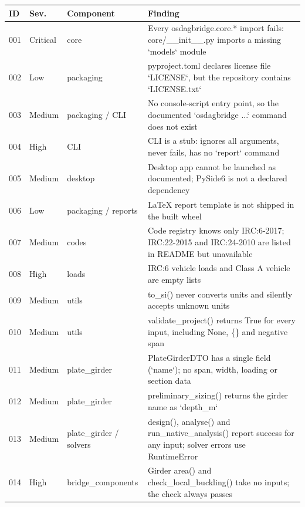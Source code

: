 \begin{longtable}{@{}p{0.9cm}p{1.5cm}p{2.6cm}p{8.2cm}@{}}
\toprule
\textbf{ID} & \textbf{Sev.} & \textbf{Component} & \textbf{Finding}\\
\midrule
\endhead
001 & Critical & core & Every osdagbridge.\allowbreak{}core.\allowbreak{}* import fails: core/\allowbreak{}\_\allowbreak{}\_\allowbreak{}init\_\allowbreak{}\_\allowbreak{}.\allowbreak{}py imports a missing `models` module \\
002 & Low & packaging & pyproject.\allowbreak{}toml declares license file `LICENSE`, but the repository contains `LICENSE.\allowbreak{}txt` \\
003 & Medium & packaging /\allowbreak{} CLI & No console-script entry point, so the documented `osdagbridge .\allowbreak{}.\allowbreak{}.\allowbreak{}` command does not exist \\
004 & High & CLI & CLI is a stub: ignores all arguments, never fails, has no `report` command \\
005 & Medium & desktop & Desktop app cannot be launched as documented; PySide6 is not a declared dependency \\
006 & Low & packaging /\allowbreak{} reports & LaTeX report template is not shipped in the built wheel \\
007 & Medium & codes & Code registry knows only IRC:6-2017; IRC:22-2015 and IRC:24-2010 are listed in README but unavailable \\
008 & High & loads & IRC:6 vehicle loads and Class A vehicle are empty lists \\
009 & Medium & utils & to\_\allowbreak{}si() never converts units and silently accepts unknown units \\
010 & Medium & utils & validate\_\allowbreak{}project() returns True for every input, including None, \{\} and negative span \\
011 & Medium & plate\_\allowbreak{}girder & PlateGirderDTO has a single field (`name`); no span, width, loading or section data \\
012 & Medium & plate\_\allowbreak{}girder & preliminary\_\allowbreak{}sizing() returns the girder name as `depth\_\allowbreak{}m` \\
013 & Medium & plate\_\allowbreak{}girder /\allowbreak{} solvers & design(), analyse() and run\_\allowbreak{}native\_\allowbreak{}analysis() report success for any input; solver errors use RuntimeError \\
014 & High & bridge\_\allowbreak{}components & Girder area() and check\_\allowbreak{}local\_\allowbreak{}buckling() take no inputs; the check always passes \\

\end{longtable}
